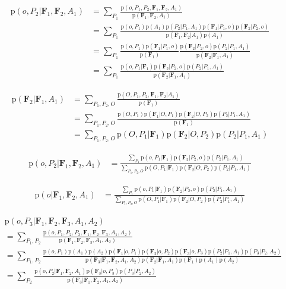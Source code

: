 \documentclass[11pt]{article}
\newcommand{\SetOf}[1]{\mathbf{#1}} %
\newcommand{\prob}[1]{\text{p}(#1)} %
\newcommand{\Eq}[1]{\begin{align*}#1\end{align*}} %
\begin{document}
	\Eq{\prob{o,P_2|\SetOf{F}_1,\SetOf{F}_2,A_1} &= \sum_{P_1} \frac{\prob{o,P_1,P_2,\SetOf{F}_1,\SetOf{F}_2,A_1}}{\prob{\SetOf{F}_1,\SetOf{F}_2,A_1}} \\
	&= \sum_{P_1} \frac{\prob{o,P_1}\prob{A_1}\prob{P_2|P_1,A_1}\prob{\SetOf{F}_1|P_1,o} \prob{\SetOf{F}_2|P_2,o}}{\prob{\SetOf{F}_1,\SetOf{F}_2|A_1}\prob{A_1}} \\
	&= \sum_{P_1} \frac{\prob{o,P_1}\prob{\SetOf{F}_1|P_1,o}}{ \prob{\SetOf{F}_1}} \frac{\prob{\SetOf{F}_2|P_2,o}\prob{P_2|P_1,A_1}}{\prob{\SetOf{F}_2|\SetOf{F}_1,A_1}} \\
	&= \sum_{P_1} \frac{ \prob{o,P_1|\SetOf{F}_1} \prob{\SetOf{F}_2|P_2,o} \prob{P_2|P_1,A_1} }{ \prob{\SetOf{F}_2|\SetOf{F}_1,A_1}} }

	\Eq{\prob{\SetOf{F}_2|\SetOf{F}_1,A_1} &= \sum_{P_1,P_2, O} \frac{\prob{O,P_1, P_2, \SetOf{F}_1, \SetOf{F}_2| A_1}}{\prob{\SetOf{F}_1}} \\ 
	&= \sum_{P_1,P_2, O} \frac{\prob{O,P_1}  \prob{\SetOf{F}_1|O,P_1} \prob{\SetOf{F}_2|O,P_2} \prob{P_2|P_1,A_1}}{\prob{\SetOf{F}_1}} \\ 
	&= \sum_{P_1,P_2, O} \prob{O,P_1|\SetOf{F}_1} \prob{\SetOf{F}_2|O,P_2} \prob{P_2|P_1,A_1}}

	\Eq{\prob{o,P_2|\SetOf{F}_1,\SetOf{F}_2,A_1} &=  \frac{ \sum_{P_1} \prob{o,P_1|\SetOf{F}_1} \prob{\SetOf{F}_2|P_2,o} \prob{P_2|P_1,A_1} }{ \sum_{P_1,P_2, O} \prob{O,P_1|\SetOf{F}_1} \prob{\SetOf{F}_2|O,P_2} \prob{P_2|P_1,A_1}} }

	\Eq{\prob{o|\SetOf{F}_1,\SetOf{F}_2,A_1} &=  \frac{ \sum_{P_1} \prob{o,P_1|\SetOf{F}_1} \prob{\SetOf{F}_2|P_2,o} \prob{P_2|P_1,A_1} }{ \sum_{P_1,P_2, O} \prob{O,P_1|\SetOf{F}_1} \prob{\SetOf{F}_2|O,P_2} \prob{P_2|P_1,A_1}} }

	\Eq{&\prob{o,P_3|\SetOf{F}_1,\SetOf{F}_2,\SetOf{F}_3,A_1,A_2} \\ 
	&= \sum_{P_1,P_2} \frac{\prob{o,P_1,P_2,P_3,\SetOf{F}_1,\SetOf{F}_2,\SetOf{F}_3,A_1,A_2}}{\prob{\SetOf{F}_1,\SetOf{F}_2,\SetOf{F}_3,A_1,A_2}} \\
	&= \sum_{P_1,P_2} \frac{\prob{o,P_1}\prob{A_1}\prob{A_2}\prob{\SetOf{F}_1|o,P_1}\prob{\SetOf{F}_2|o,P_2}\prob{\SetOf{F}_3|o,P_3}\prob{P_2|P_1,A_1}\prob{P_3|P_2,A_2}}{\prob{\SetOf{F}_3|\SetOf{F}_1,\SetOf{F}_2,A_1,A_2} \prob{\SetOf{F}_2|\SetOf{F}_1,A_1} \prob{\SetOf{F}_1} \prob{A_1} \prob{A_2} } \\
	&= \sum_{P_2} \frac{ \prob{o,P_2|\SetOf{F}_1,\SetOf{F}_2,A_1} \prob{\SetOf{F}_3|o,P_3} \prob{P_3|P_2,A_2}}{\prob{\SetOf{F}_3|\SetOf{F}_1,\SetOf{F}_2,A_1,A_2}} }
\end{document}
